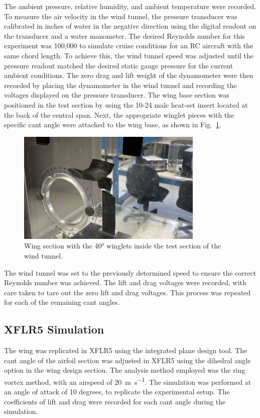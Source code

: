\documentclass[journal,letterpaper]{IEEEtran}
\begin{document}
The ambient pressure, relative humidity, and ambient temperature were recorded.
To measure the air velocity in the wind tunnel, the pressure transducer was calibrated in inches of water in the negative direction using the digital readout on the transducer and a water manometer.
The desired Reynolds number for this experiment was 100,000 to simulate cruise conditions for an RC aircraft with the same chord length.
To achieve this, the wind tunnel speed was adjusted until the pressure readout matched the desired static gauge pressure for the current ambient conditions.
The zero drag and lift weight of the dynamometer were then recorded by placing the dynamometer in the wind tunnel and recording the voltages displayed on the pressure transducer.
The wing base section was positioned in the test section by using the 10-24 male heat-set insert located at the back of the central span.
Next, the appropriate winglet pieces with the specific cant angle were attached to the wing base, as shown in Fig.~\ref{fig:wingInside}.
\begin{figure}[H]
    \centering
    \includegraphics[width=3.5in]{wingInside}
    \caption{Wing section with the \ang{40} winglets inside the test section of the wind tunnel.}
    \label{fig:wingInside}
\end{figure}
\noindent
The wind tunnel was set to the previously determined speed to ensure the correct Reynolds number was achieved.
The lift and drag voltages were recorded, with care taken to tare out the zero lift and drag voltages.
This process was repeated for each of the remaining cant angles.

\subsection{XFLR5 Simulation}

The wing was replicated in XFLR5 using the integrated plane design tool.
The cant angle of the airfoil section was adjusted in XFLR5 using the dihedral angle option in the wing design section.
The analysis method employed was the ring vortex method, with an airspeed of \qty{20}{\m\per\s}.
The simulation was performed at an angle of attack of 10 degrees, to replicate the experimental setup.
The coefficients of lift and drag were recorded for each cant angle during the simulation.
\end{document}
